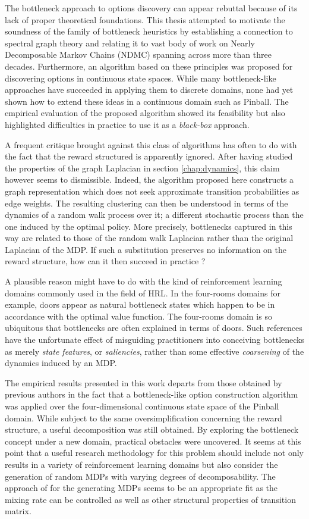 The bottleneck approach to options discovery can appear rebuttal because of its lack of proper theoretical foundations. This thesis attempted to motivate the soundness of the family of bottleneck heuristics by establishing a connection to spectral graph theory and relating it to vast body of work on Nearly Decomposable Markov Chains (NDMC) spanning across more than three decades. Furthermore, an algorithm based on these principles was proposed for discovering options in continuous state spaces. While many bottleneck-like approaches have succeeded in applying them to discrete domains, none had yet shown how to extend these ideas in a continuous domain such as Pinball. The empirical evaluation of the proposed algorithm showed its feasibility but also highlighted difficulties in practice to use it as a \textit{black-box} approach.

A frequent critique brought against this class of algorithms has often to do with the fact that the reward structured is apparently ignored. After having studied the properties of the graph Laplacian in section \ref{chap:dynamics}, this claim however seems to dismissible. Indeed, the algorithm proposed here constructs a graph representation which does not seek approximate transition probabilities as edge weights. The resulting clustering can then be understood in terms of the dynamics of a random walk process over it; a different stochastic process than the one induced by the optimal policy. More precisely, bottlenecks captured in this way are related to those of the random walk Laplacian rather than the original Laplacian of the MDP. If such a substitution preserves no information on the reward structure, how can it then succeed in practice ?

A plausible reason might have to do with the kind of reinforcement learning domains commonly used in the field of HRL. In the four-rooms domains for example, doors appear as natural bottleneck states which happen to be in accordance with the optimal value function. The four-rooms domain is so ubiquitous that bottlenecks are often explained in terms of doors. Such references have the unfortunate effect of misguiding practitioners into conceiving bottlenecks as merely \textit{state features}, or \textit{saliencies}, rather than some effective \textit{coarsening} of the dynamics induced by an MDP.

The empirical results presented in this work departs from those obtained by previous authors in the fact that a bottleneck-like option construction algorithm was applied over the four-dimensional continuous state space of the Pinball domain. While subject to the same oversimplification concerning the reward structure, a useful decomposition was still obtained. By exploring the bottleneck concept under a new domain, practical obstacles were uncovered. 
It seems at this point that a useful research methodology for this problem should include not only results in a variety of reinforcement learning domains but also consider the generation of random MDPs with varying degrees of decomposability. The approach of \cite{Archibald1995} for the generating MDPs seems to be an appropriate fit as the mixing rate can be controlled as well as other structural properties of transition matrix. 

